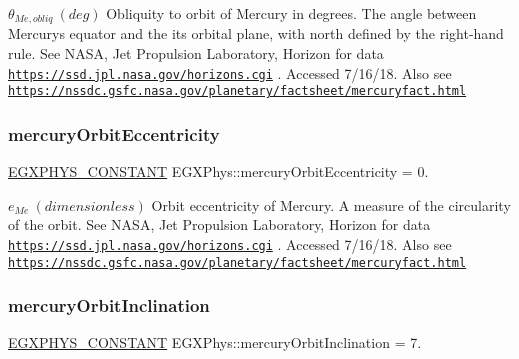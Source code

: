 $ \theta_{Me,obliq} \ (deg)$ Obliquity to orbit of Mercury in degrees. The angle between Mercury\textquotesingle{}s equator and the it\textquotesingle{}s orbital plane, with north defined by the right-\/hand rule. See N\+A\+SA, Jet Propulsion Laboratory, Horizon for data \href{https://ssd.jpl.nasa.gov/horizons.cgi}{\tt https\+://ssd.\+jpl.\+nasa.\+gov/horizons.\+cgi} . Accessed 7/16/18. Also see \href{https://nssdc.gsfc.nasa.gov/planetary/factsheet/mercuryfact.html}{\tt https\+://nssdc.\+gsfc.\+nasa.\+gov/planetary/factsheet/mercuryfact.\+html} \mbox{\label{group___e_g_x_phys-_constants-_astrophysics-_solar_system-_mercury-_orbit_gab6a88c67a02add73a0acd9c46b05d9bb}} 
\subsubsection{\texorpdfstring{mercury\+Orbit\+Eccentricity}{mercuryOrbitEccentricity}}
{\footnotesize\ttfamily \mbox{\hyperlink{group___e_g_x_phys-_constants-_macros_ga76980d288494ce1714c9ac68a95ba702}{E\+G\+X\+P\+H\+Y\+S\+\_\+\+C\+O\+N\+S\+T\+A\+NT}} E\+G\+X\+Phys\+::mercury\+Orbit\+Eccentricity = 0.}

$ e_{Me} \ (dimensionless)$ Orbit eccentricity of Mercury. A measure of the circularity of the orbit. See N\+A\+SA, Jet Propulsion Laboratory, Horizon for data \href{https://ssd.jpl.nasa.gov/horizons.cgi}{\tt https\+://ssd.\+jpl.\+nasa.\+gov/horizons.\+cgi} . Accessed 7/16/18. Also see \href{https://nssdc.gsfc.nasa.gov/planetary/factsheet/mercuryfact.html}{\tt https\+://nssdc.\+gsfc.\+nasa.\+gov/planetary/factsheet/mercuryfact.\+html} \mbox{\label{group___e_g_x_phys-_constants-_astrophysics-_solar_system-_mercury-_orbit_ga58319d10bf99a7f9e02d58440f1e5e91}} 
\subsubsection{\texorpdfstring{mercury\+Orbit\+Inclination}{mercuryOrbitInclination}}
{\footnotesize\ttfamily \mbox{\hyperlink{group___e_g_x_phys-_constants-_macros_ga76980d288494ce1714c9ac68a95ba702}{E\+G\+X\+P\+H\+Y\+S\+\_\+\+C\+O\+N\+S\+T\+A\+NT}} E\+G\+X\+Phys\+::mercury\+Orbit\+Inclination = 7.}

